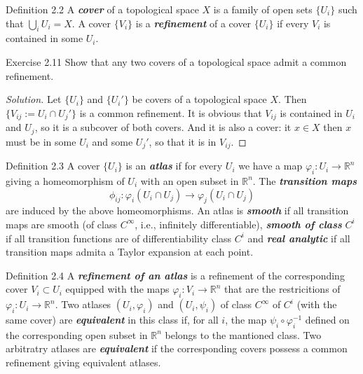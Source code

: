 \begin{thing3}{Definition 2.2}\leavevmode
	A \textit{\textbf{cover}} of a topological space $X$ is a family of open sets $\{U_i\}$ such that $\bigcup_{i} U_i=X$. A cover $\{V_i\}$ is a \textit{\textbf{refinement}} of a cover $\{U_i\}$ if every $V_i$ is contained in some $U_i$.
\end{thing3}

\begin{thing4}{Exercise 2.11}\label{exer:2.11}\leavevmode
Show that any two covers of a topological space admit a common refinement.
\end{thing4}

\begin{proof}[Solution]\leavevmode
Let $\{U_i\}$ and $\{U_i'\}$ be covers of a topological space $X$. Then  $\{V_{ij}:=U_i \cap U_j'\}$ is a common refinement. It is obvious that $V_{ij}$ is contained in $U_i$ and $U_j$, so it is a subcover of both covers. And it is also a cover: it $x \in X$ then $x$ must be in some  $U_i$ and some $U_j'$, so that it is in $V_{ij}$.
\end{proof}

\begin{thing3}{Definition 2.3}\leavevmode
	A cover $\{U_i\}$ is an \textit{\textbf{atlas}} if for every $U_i$ we have a map $\varphi_i:U_i\to \mathbb{R}^n$ giving a homeomorphism of $U_i$ with an open subset in  $\mathbb{R}^n$. The \textit{\textbf{transition maps}} 
	\[\phi_{ij}:\varphi_i(U_i\cap U_j)\to \varphi_j(U_i \cap U_j)\]
	are induced by the above homeomorphisms. An atlas is \textit{\textbf{smooth}} if all transition maps are smooth (of class $C^\infty$, i.e., infinitely differentiable), \textit{\textbf{smooth of class}} $C^i$ if all transition functions are of differentiability class $C^i$ and \textit{\textbf{real analytic}} if all transition maps admita a Taylor expansion at each point.
\end{thing3}

\begin{thing3}{Definition 2.4}\leavevmode
A \textit{\textbf{refinement of an atlas}} is a refinement of the corresponding cover $V_i \subset U_i$ equipped with the maps $\varphi_i:V_i\to \mathbb{R}^n$ that are the restricitions of $\varphi_i:U_i \to \mathbb{R}^n$. Two atlases $(U_i,\varphi_i)$ and $(U_i, \psi_i)$ of class $C^\infty$ of $C^i$ (with the same cover) are \textit{\textbf{equivalent}} in this class if, for all $i$, the map $\psi_i \circ \varphi_i^{-1}$ defined on the corresponding open subset in $\mathbb{R}^n$ belongs to the mantioned class. Two arbitratry atlases are \textit{\textbf{equivalent}} if the corresponding covers possess a common refinement giving equivalent atlases.
\end{thing3}

